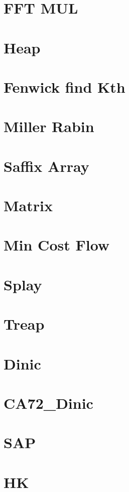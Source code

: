 \documentclass[10pt, a4paper]{article}
\begin{document}
	\section{FFT MUL}
	
	\section{Heap}
	
	\section{Fenwick find Kth}
	
	\section{Miller Rabin}
	
	\section{Saffix Array}
	
	\section{Matrix}
	
	\section{Min Cost Flow}
	
	\section{Splay}
	
	\section{Treap}
	
	\section{Dinic}
	
	\section{CA72\_Dinic}
	
	\section{SAP}
	
	\section{HK}
	
\end{document}

